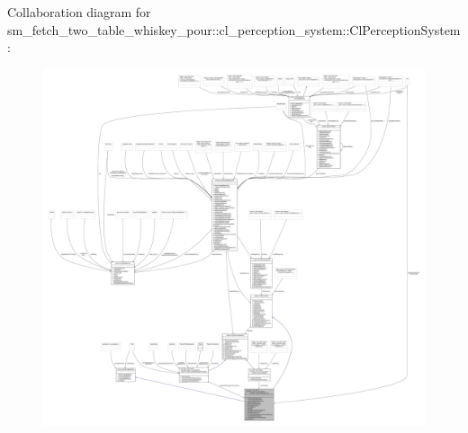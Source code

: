 Collaboration diagram for sm\+\_\+fetch\+\_\+two\+\_\+table\+\_\+whiskey\+\_\+pour\+:\+:cl\+\_\+perception\+\_\+system\+:\+:Cl\+Perception\+System\+:
\nopagebreak
\begin{figure}[H]
\begin{center}
\leavevmode
\includegraphics[width=350pt]{classsm__fetch__two__table__whiskey__pour_1_1cl__perception__system_1_1ClPerceptionSystem__coll__graph}
\end{center}
\end{figure}
